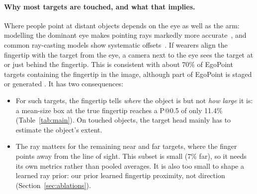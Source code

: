 \paragraph{Why most targets are touched, and what that implies.} Where people point at distant objects depends on the eye as well as the arm: modelling the dominant eye makes pointing rays markedly more accurate~\cite{plaumann2018towards}, and common ray-casting models show systematic offsets~\cite{mayer2015modeling}. If wearers align the fingertip with the target from the eye, a camera next to the eye sees the target at or just behind the fingertip. This is consistent with about 70\% of EgoPoint targets containing the fingertip in the image, although part of EgoPoint is staged or generated . It has two consequences:
\begin{itemize}
\item For such targets, the fingertip tells \emph{where} the object is but not \emph{how large} it is: a mean-size box at the true fingertip reaches a P@0.5 of only 11.4\% (Table~\ref{tab:main}). On touched objects, the target head mainly has to estimate the object's extent.
\item The ray matters for the remaining near and far targets, where the finger points away from the line of sight. This subset is small (7\% far), so it needs its own metrics rather than pooled averages. It is also too small to shape a learned ray prior: our prior learned fingertip proximity, not direction (Section~\ref{sec:ablations}).
\end{itemize}

